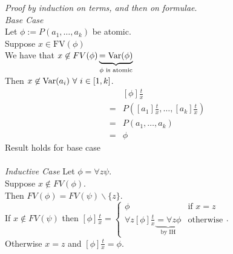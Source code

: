\documentclass[11pt,a4paper]{article}
\begin{document}
\textit{Proof by induction on terms, and then on formulae}.\\
\textit{Base Case}\\
Let $\phi:=P(a_1,\dots,a_k)$ be atomic.\\
Suppose $x\in\text{FV}(\phi)$\\
We have that $x\not\in FV(\phi)\underbrace{=\mathrm{Var}(\phi)}_{\phi\text{ is atomic}}$\\
Then $x\not\in\var(a_i)\ \forall\ i\in[1,k]$.
\[\begin{array}{rl}
&[\phi]\frac{t}x\\
=&P([a_1]\frac{t}x,\dots,[a_k]\frac{t}x)\\
=&P(a_1,\dots,a_k)\\
=&\phi
\end{array}\]
Result holds for base case\\
\\
\textit{Inductive Case}
Let $\phi=\forall z\psi$.\\
Suppose $x\not\in FV(\phi)$.\\
Then $FV(\phi)=FV(\psi)\backslash\{z\}$.\\
If $x\not\in FV(\psi)$ then $[\phi]\frac{t}x=\begin{cases}\phi&\text{if }x=z\\\forall z[\phi]\frac{t}{x}\underbrace{=\forall z\phi}_\text{by IH}&\text{otherwise}\end{cases}$.\\
Otherwise $x=z$ and $[\phi]\frac{t}x=\phi$.
\end{document}
